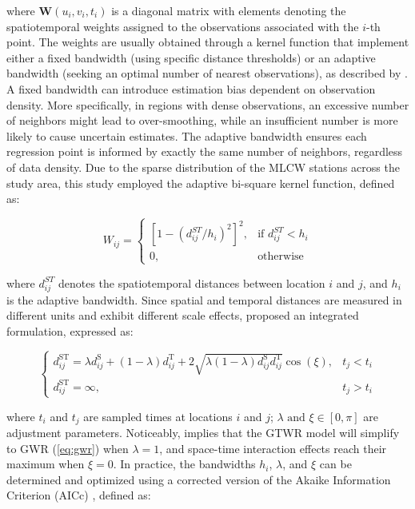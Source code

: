 \noindent where $\mathbf{W}(u_i, v_i, t_i)$ is a diagonal matrix with elements denoting the spatiotemporal weights assigned to the observations associated with the $i$-th point. The weights are usually obtained through a kernel function that implement either a fixed bandwidth (using specific distance thresholds) or an adaptive bandwidth (seeking an optimal number of nearest observations), as described by \citet{Paez2002Framework}. A fixed bandwidth can introduce estimation bias dependent on observation density. More specifically, in regions with dense observations, an excessive number of neighbors might lead to over-smoothing, while an insufficient number is more likely to cause uncertain estimates. The adaptive bandwidth ensures each regression point is informed by exactly the same number of neighbors, regardless of data density. Due to the sparse distribution of the MLCW stations across the study area, this study employed the adaptive bi-square kernel function, defined as:

\begin{equation}
W_{ij} = \begin{cases} 
	[1 - (d^{ST}_{ij}/h_i)^2]^2, & \text{if } d^{ST}_{ij} < h_i \\
	0, & \text{otherwise}
\end{cases}
\label{eq:bisquare}
\end{equation}

\noindent where $d^{ST}_{ij}$ denotes the spatiotemporal distances between location $i$ and $j$, and $h_i$ is the adaptive bandwidth. Since spatial and temporal distances are measured in different units and exhibit different scale effects, \citet{Wu2014Geographically} proposed an integrated formulation, expressed as:

\begin{equation}
\begin{cases}
	d_{ij}^{\text{ST}} = \lambda d_{ij}^{\text{S}} + (1-\lambda) d_{ij}^{\text{T}} + 2 \sqrt{\lambda (1-\lambda) d_{ij}^{\text{S}} d_{ij}^{\text{T}}} \cos(\xi), & t_j < t_i \\
	d_{ij}^{\text{ST}} = \infty, & t_j > t_i
\end{cases}
\label{eq:st_dist}
\end{equation}

\noindent where $t_i$ and $t_j$ are sampled times at locations $i$ and $j$; \( \lambda \text{ and } \xi \in [0, \pi] \) are adjustment parameters. Noticeably,  implies that the GTWR model will simplify to GWR (\cref{eq:gwr}) when $\lambda=1$, and space-time interaction effects reach their maximum when $\xi=0$. In practice, the bandwidths $h_i$, $\lambda$, and $\xi$ can be determined and optimized using a corrected version of the Akaike Information Criterion (AICc) \citep{Hurvich2002_AICc}, defined as:


